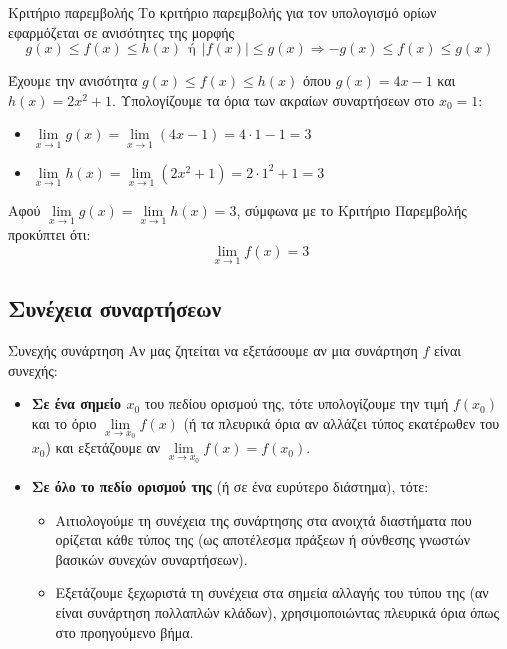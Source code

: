 \begin{askhsh}{Κριτήριο παρεμβολής}
Το κριτήριο παρεμβολής για τον υπολογισμό ορίων εφαρμόζεται σε ανισότητες της μορφής
\[ g(x)\leq f(x)\leq h(x)\ \ \textrm{ή}\ \ |f(x)|\leq g(x)\Rightarrow -g(x)\leq f(x)\leq g(x) \]
\end{askhsh}

\lysh
Έχουμε την ανισότητα $g(x) \leq f(x) \leq h(x)$ όπου $g(x) = 4x-1$ και $h(x) = 2x^2+1$.
Υπολογίζουμε τα όρια των ακραίων συναρτήσεων στο $x_0=1$:
\begin{itemize}
\item $\displaystyle \lim\limits_{x\to 1} g(x) = \lim\limits_{x\to 1} (4x-1) = 4\cdot 1 - 1 = 3$
\item $\displaystyle \lim\limits_{x\to 1} h(x) = \lim\limits_{x\to 1} (2x^2+1) = 2\cdot 1^2 + 1 = 3$
\end{itemize}
Αφού $\lim\limits_{x\to 1} g(x) = \lim\limits_{x\to 1} h(x) = 3$, σύμφωνα με το Κριτήριο Παρεμβολής προκύπτει ότι:
\[ \lim\limits_{x\to 1} f(x) = 3 \]
\subsection{Συνέχεια συναρτήσεων}
\begin{askhsh}{Συνεχής συνάρτηση}
Αν μας ζητείται να εξετάσουμε αν μια συνάρτηση $f$ είναι συνεχής:
\begin{itemize}
\item \textbf{Σε ένα σημείο $x_0$} του πεδίου ορισμού της, τότε υπολογίζουμε την τιμή $f(x_0)$ και το όριο $\lim\limits_{x\to x_0}{f(x)}$ (ή τα πλευρικά όρια αν αλλάζει τύπος εκατέρωθεν του $x_0$) και εξετάζουμε αν $\lim\limits_{x\to x_0}{f(x)}=f(x_0)$.
\item \textbf{Σε όλο το πεδίο ορισμού της} (ή σε ένα ευρύτερο διάστημα), τότε:
  \begin{itemize}
    \item Αιτιολογούμε τη συνέχεια της συνάρτησης στα ανοιχτά διαστήματα που ορίζεται κάθε τύπος της (ως αποτέλεσμα πράξεων ή σύνθεσης γνωστών βασικών συνεχών συναρτήσεων).
    \item Εξετάζουμε ξεχωριστά τη συνέχεια στα σημεία αλλαγής του τύπου της (αν είναι συνάρτηση πολλαπλών κλάδων), χρησιμοποιώντας πλευρικά όρια όπως στο προηγούμενο βήμα.
  \end{itemize}
\end{itemize}
\end{askhsh}

